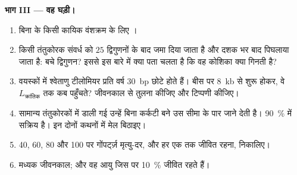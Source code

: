 \begin{problem}
\medskip
\noindent\textbf{भाग III --- वह घड़ी।}
\begin{enumerate}[resume]
  \item बिना  के किसी कायिक वंशक्रम के लिए ।
  \item किसी तंतुकोरक संवर्ध को $25$ द्विगुणनों के बाद जमा दिया जाता है
        और दशक भर बाद पिघलाया जाता है: बचे द्विगुणन? इससे इस बारे में
        क्या पता चलता है कि वह कोशिका क्या गिनती है?
  \item वयस्कों में श्वेताणु टीलोमियर प्रति वर्ष \qty{30}{bp} छोटे होते
        हैं। बीस पर \qty{8}{kb} से शुरू होकर, वे $L_{\text{क्रांतिक}}$ तक
        कब पहुँचते? जीवनकाल से तुलना कीजिए और टिप्पणी कीजिए।
  \item सामान्य तंतुकोरकों में डाली गई  उन्हें बिना कर्कटी बने
        उस सीमा के पार जाने देती है।  \qty{90}{\%}  में
        सक्रिय है। इन दोनों कथनों में मेल बिठाइए।
  \item 40, 60, 80 और 100 पर गोंपर्ट्ज़ मृत्यु-दर, और हर एक तक जीवित
        रहना, निकालिए।
  \item मध्यक जीवनकाल; और वह आयु जिस पर \qty{10}{\%} जीवित रहते हैं।
\end{enumerate}


\end{problem}
